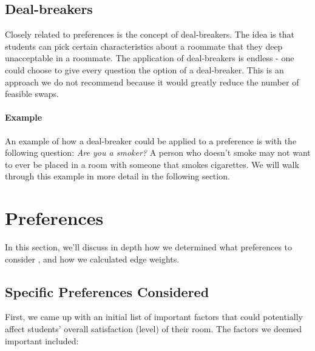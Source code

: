 \documentclass[12pt]{article}
\begin{document}
\begin{multicols}{2}
\subsection{Deal-breakers} 
Closely related to preferences is the concept of deal-breakers. The idea is that students can pick certain characteristics about a roommate that they deep unacceptable in a roommate. The application of deal-breakers is endless - one could choose to give every question the option of a deal-breaker. This is an approach we do not recommend because it would greatly reduce the number of feasible swaps. 
\paragraph{Example}
An example of how a deal-breaker could be applied to a preference is with the following question: \textit{Are you a smoker?} A person who doesn't smoke may not want to ever be placed in a room with someone that smokes cigarettes. We will walk through this example in more detail in the following section.

\section{Preferences}
In this section, we'll discuss in depth how we determined what preferences to consider , and how we calculated edge weights. 


\subsection{Specific Preferences Considered}
First, we came up with an initial list of important factors that could potentially affect students' overall satisfaction (level) of their room. The factors we deemed important included: 
\begin{itemize}[noitemsep]


\end{itemize}
\end{multicols}
\end{document}
